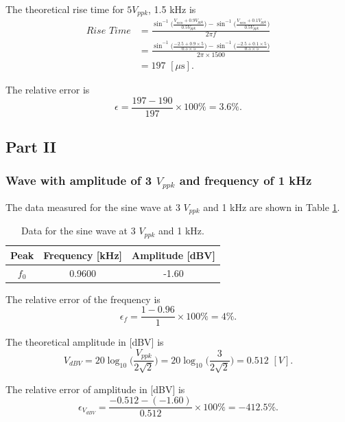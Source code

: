 \documentclass{article}
\begin{document}
\vspace*{0.3cm}

The theoretical rise time for $5V_{ppk}$, 1.5 kHz is
\begin{align*}
    Rise\,\,Time & = \frac{\sin^{-1}\big(\frac{V_{min}+0.9V_{ppk}}{0.5V_{ppk}}\big)-\sin^{-1}\big(\frac{V_{min}+0.1V_{ppk}}{0.5V_{ppk}}\big)}{2\pi f}         \\
                 & = \frac{\sin^{-1}\big(\frac{-2.5+0.9\times 5}{0.5\times 5}\big)-\sin^{-1}\big(\frac{-2.5+0.1\times 5}{0.5\times 5}\big)}{2\pi \times 1500} \\
                 & = 197\,\,[\mu\text{s}].
\end{align*}

The relative error is
$$\epsilon = \frac{197-190}{197}\times 100\% = 3.6\%.$$


\subsection{Part II}

\subsubsection{Wave with amplitude of 3 $V_{ppk}$ and frequency of 1 kHz}

The data measured for the sine wave at 3 $V_{ppk}$ and 1 kHz are shown in Table \ref{TableSine1}.

\begin{table}[H]\centering
    \begin{tabular}{ccc}
        \toprule
        Peak  & Frequency [kHz] & Amplitude [dBV] \\
        \midrule
        $f_0$ & 0.9600          & -1.60           \\
        \bottomrule
    \end{tabular}
    \caption{Data for the sine wave at 3 $V_{ppk}$ and 1 kHz.}\label{TableSine1}
\end{table}

The relative error of the frequency is
$$\epsilon_f = \frac{1-0.96}{1}\times 100\% = 4\%.$$

The theoretical amplitude in [dBV] is
$$V_{dBV} = 20\log_{10}\bigg(\frac{V_{ppk}}{2\sqrt{2}}\bigg) = 20\log_{10}\bigg(\frac{3}{2\sqrt{2}}\bigg) = 0.512\,\,[V].$$

The relative error of amplitude in [dBV] is
$$\epsilon_{V_{dBV}} = \frac{-0.512-(-1.60)}{0.512}\times 100\% = -412.5\%.$$
\end{document}
